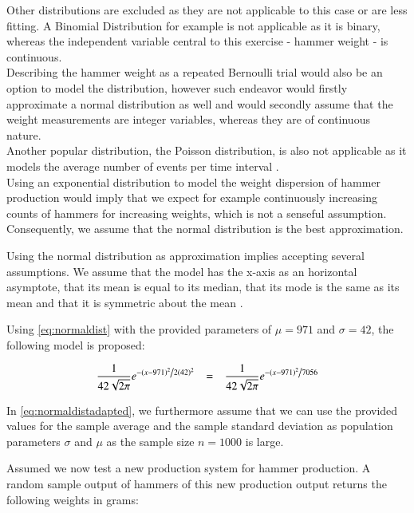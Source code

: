 Other distributions are excluded as they are not applicable to this case or are less fitting. A Binomial Distribution for example is not applicable as it is binary, whereas the independent variable central to this exercise - hammer weight - is continuous. \\Describing the hammer weight as a repeated Bernoulli trial would also be an option to model the distribution, however such endeavor would firstly approximate a normal distribution as well and would secondly assume that the weight measurements are integer variables, whereas they are of continuous nature. \\
Another popular distribution, the Poisson distribution, is also not applicable as it models the average number of events per time interval \cite{bruce2017practical}. \\
Using an exponential distribution to model the weight dispersion of hammer production would imply that we expect for example continuously increasing counts of hammers for increasing weights, which is not a senseful assumption. \\
Consequently, we assume that the normal distribution is the best approximation.

Using the normal distribution as approximation implies accepting several assumptions. We assume that the model has the x-axis as an horizontal asymptote, that its mean is equal to its median, that its mode is the same as its mean and that it is symmetric about the mean \cite[Chapter~3.4]{hogg}.

Using \ref{eq:normaldist} with the provided parameters of $\mu = 971$ and $\sigma = 42$, the following model is proposed: 

\begin{equation} \frac{1}{{42 \sqrt {2\pi } }}e^{{{ - \left( {x - 971 } \right)^2 } \mathord{\left/ {\vphantom {{ - \left( {x - 971 } \right)^2 } {2(42) ^2 }}} \right. \kern-\nulldelimiterspace}{2(42) ^2 }}} ~~~=~~~ \frac{1}{{42 \sqrt {2\pi } }}e^{{{ - \left( {x - 971 } \right)^2 } \mathord{\left/ {\vphantom {{ - \left( {x - 971 } \right)^2 } {7056 }}} \right. \kern-\nulldelimiterspace}{7056 }}}
\label{eq:normaldistadapted}
\end{equation}

In \ref{eq:normaldistadapted}, we furthermore assume that we can use the provided values for the sample average and the sample standard deviation as population parameters $\sigma$ and $\mu$ as the sample size $n = 1000$ is large. 

Assumed we now test a new production system for hammer production. A random sample output of hammers of this new production output returns the following weights in grams: \\

